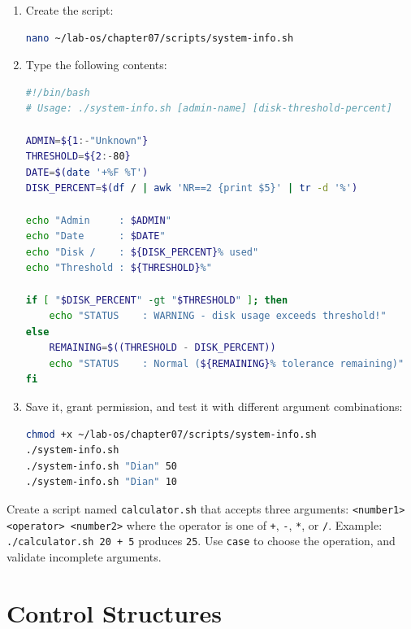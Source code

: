 \begin{enumerate}
  \item Create the script:
\begin{lstlisting}[language=bash, caption={Creating system-info.sh}]
nano ~/lab-os/chapter07/scripts/system-info.sh
\end{lstlisting}

  \item Type the following contents:
\begin{lstlisting}[language=bash, caption={Contents of system-info.sh}]
#!/bin/bash
# Usage: ./system-info.sh [admin-name] [disk-threshold-percent]

ADMIN=${1:-"Unknown"}
THRESHOLD=${2:-80}
DATE=$(date '+%F %T')
DISK_PERCENT=$(df / | awk 'NR==2 {print $5}' | tr -d '%')

echo "Admin     : $ADMIN"
echo "Date      : $DATE"
echo "Disk /    : ${DISK_PERCENT}% used"
echo "Threshold : ${THRESHOLD}%"

if [ "$DISK_PERCENT" -gt "$THRESHOLD" ]; then
    echo "STATUS    : WARNING - disk usage exceeds threshold!"
else
    REMAINING=$((THRESHOLD - DISK_PERCENT))
    echo "STATUS    : Normal (${REMAINING}% tolerance remaining)"
fi
\end{lstlisting}

  \item Save it, grant permission, and test it with different argument
    combinations:
\begin{lstlisting}[language=bash, caption={Testing the script}]
chmod +x ~/lab-os/chapter07/scripts/system-info.sh
./system-info.sh
./system-info.sh "Dian" 50
./system-info.sh "Dian" 10
\end{lstlisting}
\end{enumerate}

\begin{exercisebox}[Exercise 7.2]
Create a script named \texttt{calculator.sh} that accepts three arguments:
\texttt{<number1> <operator> <number2>} where the operator is one of
\texttt{+}, \texttt{-}, \texttt{*}, or \texttt{/}. Example:
\texttt{./calculator.sh 20 + 5} produces \texttt{25}. Use \texttt{case} to
choose the operation, and validate incomplete arguments.
\end{exercisebox}

\section{Control Structures}
\label{sec:control-structures}

